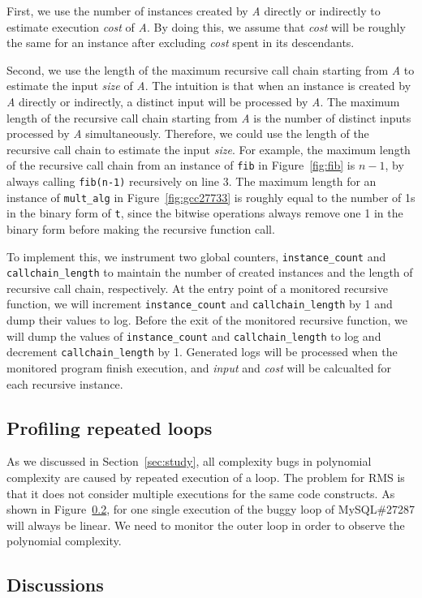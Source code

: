 First, we use the number of instances created by \textit{A} directly or indirectly 
to estimate execution \textit{cost} of \textit{A}.
By doing this, we assume that \textit{cost} 
will be roughly the same for an instance after excluding 
\textit{cost} spent in its descendants.

Second, we use the length of 
the maximum recursive call chain starting from \textit{A} to estimate
the input \textit{size} of \textit{A}. 
The intuition is that 
when an instance is created by \textit{A} directly or indirectly, 
a distinct input will be processed by \textit{A}.
The maximum length of the recursive call chain starting from \textit{A} 
is the number of distinct inputs processed by \textit{A} simultaneously.
Therefore, we could use the length of the recursive call chain 
to estimate the input \textit{size}. 
For example, 
the maximum length of the recursive call chain from an instance of \texttt{fib} 
in Figure~\ref{fig:fib} is $n-1$, 
by always calling \texttt{fib(n-1)} recursively on line 3.
The maximum length for an instance of \texttt{mult\_alg} 
in Figure~\ref{fig:gcc27733} 
is roughly equal to the number of 1s in the binary form of \texttt{t},
since the bitwise operations always remove one 1 in the binary 
form before making the recursive function call.  
  

To implement this, 
we instrument two global counters, 
\texttt{instance\_count} and \texttt{callchain\_length} 
to maintain the number of created instances and 
the length of recursive call chain, respectively. 
At the entry point of a monitored recursive function,
we will increment \texttt{instance\_count} and \texttt{callchain\_length} by 1
and dump their values to log.
Before the exit of the monitored recursive function,
we will dump the values of 
\texttt{instance\_count} and \texttt{callchain\_length} 
to log
and decrement \texttt{callchain\_length} by 1.
Generated logs will be processed when the monitored program finish execution, 
and \textit{input} and \textit{cost} 
will be calcualted for each recursive instance.   
  




\subsection{Profiling repeated loops}

As we discussed in Section~\ref{sec:study}, 
all complexity bugs in polynomial complexity are caused by repeated execution of a loop. 
The problem for RMS is that it does not consider 
multiple executions for the same code constructs. 
As shown in Figure~\ref{}, 
for one single execution of the buggy loop of MySQL\#27287 will always be linear. 
We need to monitor the outer loop in order to observe the polynomial complexity. 





\subsection{Discussions}

